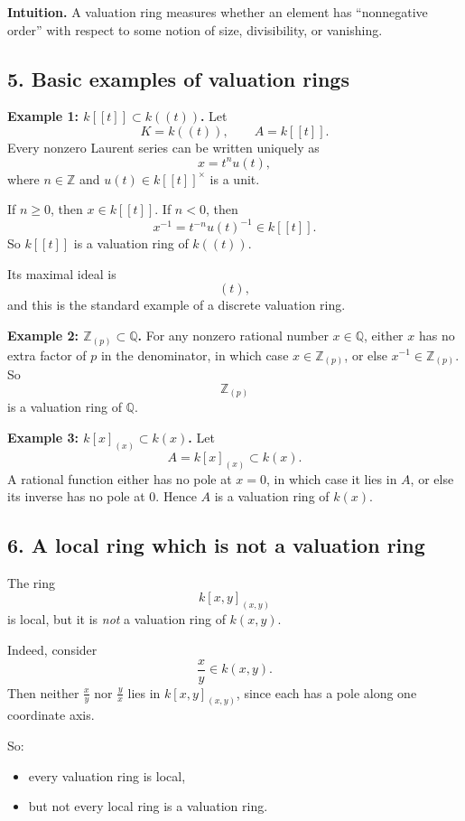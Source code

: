 \documentclass[12pt,a4paper]{article}
\theoremstyle{notespace}
\begin{document}
\textbf{Intuition.}
A valuation ring measures whether an element has ``nonnegative order'' with respect to some notion of size, divisibility, or vanishing.

\subsection*{5. Basic examples of valuation rings}

\textbf{Example 1: \(k[[t]]\subset k((t))\).}
Let
\[
K=k((t)),
\qquad
A=k[[t]].
\]
Every nonzero Laurent series can be written uniquely as
\[
x=t^n u(t),
\]
where \(n\in \mathbb Z\) and \(u(t)\in k[[t]]^\times\) is a unit.

If \(n\ge 0\), then \(x\in k[[t]]\). If \(n<0\), then
\[
x^{-1}=t^{-n}u(t)^{-1}\in k[[t]].
\]
So \(k[[t]]\) is a valuation ring of \(k((t))\).

Its maximal ideal is
\[
(t),
\]
and this is the standard example of a discrete valuation ring.

\textbf{Example 2: \(\mathbb Z_{(p)}\subset \mathbb Q\).}
For any nonzero rational number \(x\in \mathbb Q\), either \(x\) has no extra factor of \(p\) in the denominator, in which case \(x\in \mathbb Z_{(p)}\), or else \(x^{-1}\in \mathbb Z_{(p)}\). So
\[
\mathbb Z_{(p)}
\]
is a valuation ring of \(\mathbb Q\).

\textbf{Example 3: \(k[x]_{(x)}\subset k(x)\).}
Let
\[
A=k[x]_{(x)} \subset k(x).
\]
A rational function either has no pole at \(x=0\), in which case it lies in \(A\), or else its inverse has no pole at \(0\). Hence \(A\) is a valuation ring of \(k(x)\).

\subsection*{6. A local ring which is not a valuation ring}

The ring
\[
k[x,y]_{(x,y)}
\]
is local, but it is \emph{not} a valuation ring of \(k(x,y)\).

Indeed, consider
\[
\frac{x}{y}\in k(x,y).
\]
Then neither \(\frac{x}{y}\) nor \(\frac{y}{x}\) lies in \(k[x,y]_{(x,y)}\), since each has a pole along one coordinate axis.

So:
\begin{itemize}
	\item every valuation ring is local,
	\item but not every local ring is a valuation ring.
\end{itemize}
\end{document}
